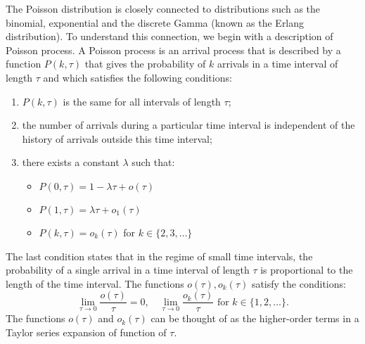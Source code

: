The Poisson distribution is closely connected to distributions such as the binomial, exponential and the discrete Gamma
(known as the Erlang distribution). To understand this connection, we begin with a description of Poisson process.
A Poisson process is an arrival process that is described by a function $P(k, \tau)$ that gives the probability
of $k$ arrivals in a time interval of length $\tau$ and which satisfies the following conditions:
\begin{enumerate}
    \item $P(k, \tau)$ is the same for all intervals of length $\tau$;
    \item the number of arrivals during a particular time interval is independent of the history of arrivals outside
        this time interval;
    \item there exists a constant $\lambda$ such that:
        \begin{itemize}
            \item $P(0, \tau) = 1 - \lambda \tau + o(\tau)$
            \item $P(1, \tau) = \lambda \tau + o_1(\tau)$
            \item $P(k, \tau) = o_k(\tau)$ for $k \in \{2, 3, \ldots\}$
        \end{itemize}
\end{enumerate}
The last condition states that in the regime of small time intervals, the probability of a single arrival in a time interval
of length $\tau$ is proportional to the length of the time interval. The functions $o(\tau), o_k(\tau)$ satisfy the conditions:
\[
    \lim_{\tau \to 0} \frac{o(\tau)}{\tau} = 0, \quad \lim_{\tau \to 0} \frac{o_k(\tau)}{\tau} \text{ for } k \in \{1, 2, \ldots\}.
\]
The functions $o(\tau)$ and $o_k(\tau)$ can be thought of as the higher-order terms in a Taylor series expansion of function of $\tau$.

